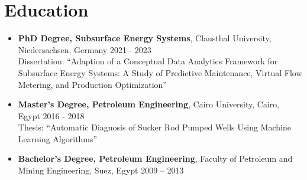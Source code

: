 \documentclass[a4paper,10pt]{article}
\begin{document}
\section*{Education}
\begin{itemize}[leftmargin=0.5cm]
    \item \textbf{PhD Degree, Subsurface Energy Systems}, Clausthal University, Niedersachsen, Germany \hfill 2021 - 2023 \\
    Dissertation: “Adaption of a Conceptual Data Analytics Framework for Subsurface Energy Systems: A Study of Predictive Maintenance, Virtual Flow Metering, and Production Optimization” \\
    
    \item \textbf{Master's Degree, Petroleum Engineering}, Cairo University, Cairo, Egypt \hfill 2016 - 2018 \\
    Thesis: “Automatic Diagnosis of Sucker Rod Pumped Wells Using Machine Learning Algorithms” \\
    
    \item \textbf{Bachelor's Degree, Petroleum Engineering}, Faculty of Petroleum and Mining Engineering, Suez, Egypt \hfill 2009 – 2013 
\end
{itemize}
\end{document}
